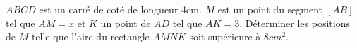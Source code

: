 
$ABCD$ est un carré de coté de longueur 4cm. $M$ est un point du segment $[AB]$ tel que $AM =x$ et $K$ un point de $AD$ tel que $AK=3$. Déterminer les positions de $M$ telle que l'aire du rectangle $AMNK$ soit supérieure à $8 cm^2$.